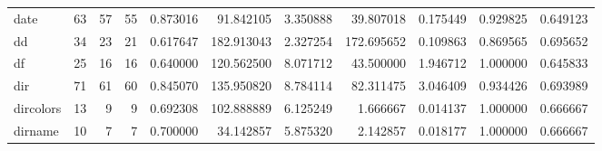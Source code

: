 \begin{tabular}{lrrrrrrrrrr}
date      &                                      63 &                 57 &                                55 &                                   0.873016 &                              91.842105 &                                     3.350888 &                         39.807018 &                                0.175449 &                           0.929825 &                                           0.649123 \\
dd        &                                      34 &                 23 &                                21 &                                   0.617647 &                             182.913043 &                                     2.327254 &                        172.695652 &                                0.109863 &                           0.869565 &                                           0.695652 \\
df        &                                      25 &                 16 &                                16 &                                   0.640000 &                             120.562500 &                                     8.071712 &                         43.500000 &                                1.946712 &                           1.000000 &                                           0.645833 \\
dir       &                                      71 &                 61 &                                60 &                                   0.845070 &                             135.950820 &                                     8.784114 &                         82.311475 &                                3.046409 &                           0.934426 &                                           0.693989 \\
dircolors &                                      13 &                  9 &                                 9 &                                   0.692308 &                             102.888889 &                                     6.125249 &                          1.666667 &                                0.014137 &                           1.000000 &                                           0.666667 \\
dirname   &                                      10 &                  7 &                                 7 &                                   0.700000 &                              34.142857 &                                     5.875320 &                          2.142857 &                                0.018177 &                           1.000000 &                                           0.666667 \\

\end{tabular}
